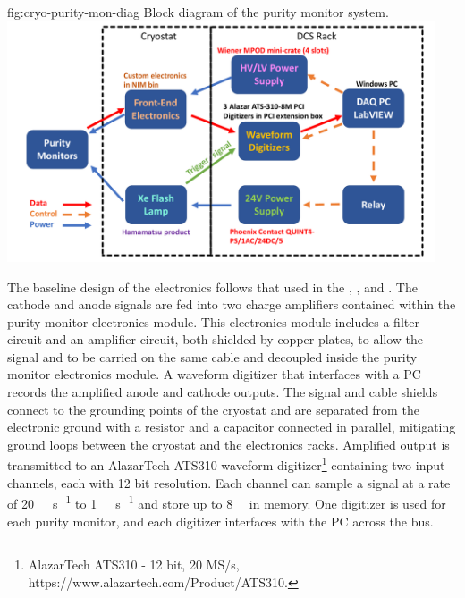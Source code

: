 \begin{dunefigure}{fig:cryo-purity-mon-diag}
  {Block diagram of the purity monitor system.}
  \includegraphics[width=0.95\textwidth]{graphics/PrMon_BlockDiagram_v2.pdf}
\end{dunefigure}


The baseline design of the  electronics follows that used in %
the ,  , and \microboone. The cathode and anode signals are fed into two charge amplifiers contained within the purity monitor electronics module.
This electronics module includes a  filter circuit and an amplifier circuit, both shielded by copper plates, to allow the signal and  to be carried on the same cable and decoupled inside the purity monitor electronics module. 
A waveform digitizer that interfaces with a  PC records the amplified anode and cathode outputs. 
The signal and  cable shields connect to the grounding points of the cryostat and are separated from the electronic ground with a resistor and a capacitor connected in parallel, mitigating ground loops between the cryostat and the electronics racks. Amplified output is transmitted to an AlazarTech ATS310 waveform digitizer\footnote{AlazarTech ATS310\texttrademark{} - 12 bit, 20 MS/s,  https://www.alazartech.com/Product/ATS310.} containing two input channels, each with 12 bit resolution. Each channel can sample a signal at a rate of \SI{20}{\mega\samples\per\second} to \SI{1}{\kilo\samples\per\second} and store up to \SI{8}{\mega\samples} in memory. One digitizer is used for each purity monitor, and each digitizer interfaces with the  PC across the  bus. 

